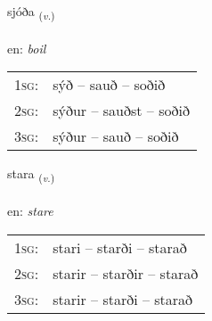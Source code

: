 \documentclass[frontgrid, backgrid]{flacards}\usepackage[]{graphicx}\usepackage[]{xcolor}
\begin{document}
\renewcommand{\flhead}{\vskip5pt \fboxsep=0pt {\small\bfseries\footnotesize Sagnorð | Verb}}
\renewcommand{\fcfoot}{\vskip5pt \fboxsep=0pt \hspace{2pt}{\small\bfseries\footnotesize 3K}}

\renewcommand{\blhead}{\vskip5pt {\small\bfseries\footnotesize Sagnorð | Verb }}
\renewcommand{\bcfoot}{\vskip5pt \hspace{2pt}{\small\bfseries\footnotesize 3K}}


{sjóða \small{\textsubscript{(\textit{v.})}} \\[1ex] %
\textphonetic{[sjouːða]} \\
en: \emph{boil} \\  [2ex]
\renewcommand*{\arraystretch}{0.8}
\begin{tabular}{p{1cm}l}
\textsc{1sg}: & sýð -- sauð -- soðið \\ 
\textsc{2sg}: & sýður -- sauðst -- soðið \\ 
\textsc{3sg}: & sýður -- sauð -- soðið \\ 
\end{tabular}
}

\renewcommand{\flhead}{\vskip5pt \fboxsep=0pt {\small\bfseries\footnotesize Sagnorð | Verb}}
\renewcommand{\fcfoot}{\vskip5pt \fboxsep=0pt \hspace{2pt}{\small\bfseries\footnotesize 3K}}

\renewcommand{\blhead}{\vskip5pt {\small\bfseries\footnotesize Sagnorð | Verb }}
\renewcommand{\bcfoot}{\vskip5pt \hspace{2pt}{\small\bfseries\footnotesize 3K}}


{stara \small{\textsubscript{(\textit{v.})}} \\[1ex] %
\textphonetic{[staːra]} \\
en: \emph{stare} \\  [2ex]
\renewcommand*{\arraystretch}{0.8}
\begin{tabular}{p{1cm}l}
\textsc{1sg}: & stari -- starði -- starað \\ 
\textsc{2sg}: & starir -- starðir -- starað \\ 
\textsc{3sg}: & starir -- starði -- starað \\ 
\end{tabular}
}
\end{document}
